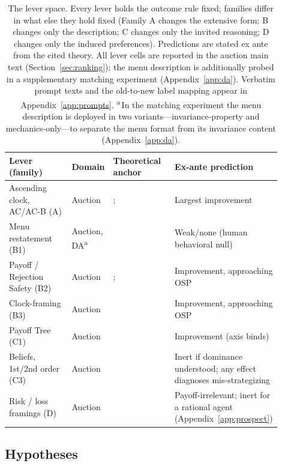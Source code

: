 \begin{table}[t]
\centering
\footnotesize
\begin{tabular}{@{}p{0.26\linewidth}p{0.12\linewidth}p{0.24\linewidth}p{0.28\linewidth}@{}}
\toprule
Lever (family) & Domain & Theoretical anchor & Ex-ante prediction \\
\midrule
Ascending clock, AC/AC-B (A) & Auction & \citet{li2017obviously}; \citet{pycia2023theory} & Largest improvement \\
\addlinespace
Menu restatement (B1) & Auction, DA\textsuperscript{a} & \citet{gonczarowski2023strategyproofness} & Weak/none (human behavioral null) \\
Payoff / Rejection Safety (B2) & Auction & \citet{gonczarowski2023strategyproofness}; \citet{vickrey1961counterspeculation} & Improvement, approaching OSP \\
Clock-framing (B3) & Auction & \citet{breitmoser2022obviousness} & Improvement, approaching OSP \\
\addlinespace
Payoff Tree (C1) & Auction & \citet{li2024designing} & Improvement (axis binds) \\
Beliefs, 1st/2nd order (C3) & Auction & \citet{borgers2019strategically} & Inert if dominance understood; any effect diagnoses mis-strategizing \\
\addlinespace
Risk / loss framings (D) & Auction & \citet{kahneman1979prospect} & Payoff-irrelevant; inert for a rational agent (Appendix~\ref{app:prospect}) \\
\bottomrule
\end{tabular}
\caption{The lever space. Every lever holds the outcome rule fixed; families differ in what else they hold fixed (Family A changes the extensive form; B changes only the description; C changes only the invited reasoning; D changes only the induced preferences). Predictions are stated ex ante from the cited theory. All lever cells are reported in the auction main text (Section~\ref{sec:ranking}); the menu description is additionally probed in a supplementary matching experiment (Appendix~\ref{app:da}). Verbatim prompt texts and the old-to-new label mapping appear in Appendix~\ref{app:prompts}. \textsuperscript{a}\,In the matching experiment the menu description is deployed in two variants---invariance-property and mechanics-only---to separate the menu format from its invariance content (Appendix~\ref{app:da}).}
\label{tab:framework-levers}
\end{table}

\subsection{Hypotheses}\label{sec:framework-hypotheses}

